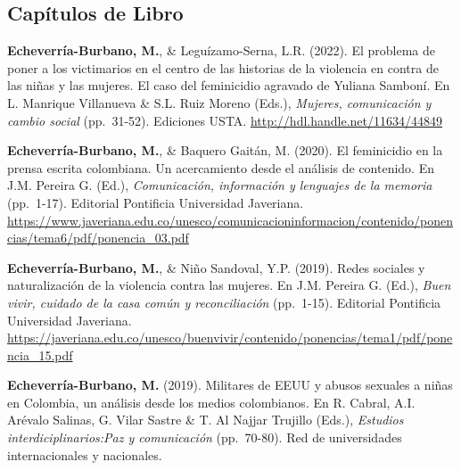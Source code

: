 \documentclass[11pt,a4paper,]{awesome-cv}
\begin{document}
\endgroup

\hypertarget{section-1}{%
\subsection{\texorpdfstring{\textbf{Capítulos de Libro}}{}}\label{section-1}}

\begingroup
\setlength{\parindent}{-0.5in}
\setlength{\leftskip}{0.5in}

\textbf{Echeverría-Burbano, M.}, \& Leguízamo-Serna, L.R. (2022). El
problema de poner a los victimarios en el centro de las historias de la
violencia en contra de las niñas y las mujeres. El caso del feminicidio
agravado de Yuliana Samboní. En L. Manrique Villanueva \& S.L. Ruiz
Moreno (Eds.), \emph{Mujeres, comunicación y cambio social} (pp.~31-52).
Ediciones USTA. \url{http://hdl.handle.net/11634/44849}

\textbf{Echeverría-Burbano, M.}, \& Baquero Gaitán, M. (2020). El
feminicidio en la prensa escrita colombiana. Un acercamiento desde el
análisis de contenido. En J.M. Pereira G. (Ed.), \emph{Comunicación,
información y lenguajes de la memoria} (pp.~1-17). Editorial Pontificia
Universidad Javeriana.
\url{https://www.javeriana.edu.co/unesco/comunicacioninformacion/contenido/ponencias/tema6/pdf/ponencia_03.pdf}

\textbf{Echeverría-Burbano, M.}, \& Niño Sandoval, Y.P. (2019). Redes
sociales y naturalización de la violencia contra las mujeres. En J.M.
Pereira G. (Ed.), \emph{Buen vivir, cuidado de la casa común y
reconciliación} (pp.~1-15). Editorial Pontificia Universidad Javeriana.
\url{https://javeriana.edu.co/unesco/buenvivir/contenido/ponencias/tema1/pdf/ponencia_15.pdf}

\textbf{Echeverría-Burbano, M.} (2019). Militares de EEUU y abusos
sexuales a niñas en Colombia, un análisis desde los medios colombianos.
En R. Cabral, A.I. Arévalo Salinas, G. Vilar Sastre \& T. Al Najjar
Trujillo (Eds.), \emph{Estudios interdiciplinarios:Paz y comunicación}
(pp.~70-80). Red de universidades internacionales y nacionales.

\endgroup
\end{document}

